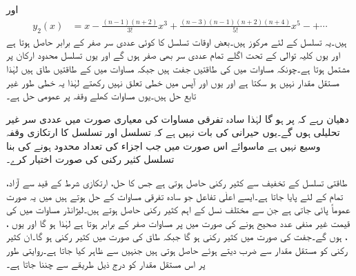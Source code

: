 اور
\begin{align}\label{مساوات_بیسل_حل_لیژانڈر_ب}
y_2(x)&=x-\frac{(n-1)(n+2)}{3!}x^3+\frac{(n-3)(n-1)(n+2)(n+4)}{5!}x^5-+\cdots
\end{align}
ہیں۔یہ تسلسل  کے لئے مرکوز ہیں۔بعض اوقات تسلسل کا کوئی عددی سر صفر کے برابر حاصل ہوتا ہے اور یوں کلیہ توالی کے تحت اگلے تمام عددی سر بھی صفر ہوں گے اور یوں تسلسل محدود ارکان پر مشتمل ہوتا ہے۔چونکہ مساوات  میں  کی طاقتیں  جفت  ہیں جبکہ مساوات  میں  کے طاقتیں طاق ہیں لہٰذا  مستقل مقدار نہیں ہو سکتا ہے اور یوں  اور  آپس میں خطی تعلق نہیں رکھتے لہٰذا یہ خطی طور غیر تابع حل ہیں۔یوں مساوات  کھلے وقفہ  پر عمومی حل ہے۔

دھیان رہے کہ  پر  ہو گا لہٰذا سادہ تفرقی مساوات کی معیاری صورت میں عددی سر غیر تحلیلی ہوں گے۔یوں حیرانی کی بات نہیں ہے کہ تسلسل  اور تسلسل  کا ارتکازی وقفہ وسیع نہیں ہے ماسوائے اس صورت میں جب  اجزاء کی تعداد محدود ہونے کی بنا  تسلسل کثیر رکنی کی صورت اختیار کرے۔

طاقتی تسلسل کے تخفیف سے کثیر رکنی حاصل ہوتی ہے جس کا حل، ارتکازی شرط کے قید سے آزاد،  تمام  کے لئے پایا جاتا ہے۔ایسے اعلٰی تفاعل جو سادہ تفرقی مساوات کے حل ہوتے ہیں میں یہ صورت عموماً پائی جاتی ہے جن سے مختلف نسل کے اہم کثیر رکنی حاصل ہوتے ہیں۔لیژانڈر مساوات میں  کی قیمت غیر منفی عدد صحیح ہونے کی صورت میں  پر مساوات  صفر کے برابر ہوتا ہے لہٰذا  ہو گا اور یوں ، ،  ہوں گے۔جفت  کی صورت میں  کثیر رکنی ہو گا جبکہ طاق  کی صورت میں  کثیر رکنی ہو گا۔ان کثیر رکنی کو مستقل مقدار سے ضرب دیتے ہوئے  حاصل ہوتی ہیں جنہیں  سے ظاہر کیا جاتا ہے۔روایتی طور پر اس مستقل مقدار کو درج ذیل طریقے سے چننا جاتا ہے۔

